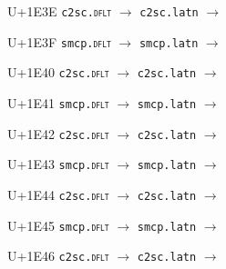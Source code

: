 \documentclass{article}
\begin{document}
\begin{substitutions}
\goodbreak

U+1E3E  \linebreak
    \texttt{c2sc.\textsc{dflt}} $\to$  \linebreak
    \texttt{c2sc.latn} $\to$  

\goodbreak

U+1E3F  \linebreak
    \texttt{smcp.\textsc{dflt}} $\to$  \linebreak
    \texttt{smcp.latn} $\to$  

\goodbreak

U+1E40  \linebreak
    \texttt{c2sc.\textsc{dflt}} $\to$  \linebreak
    \texttt{c2sc.latn} $\to$  

\goodbreak

U+1E41  \linebreak
    \texttt{smcp.\textsc{dflt}} $\to$  \linebreak
    \texttt{smcp.latn} $\to$  

\goodbreak

U+1E42  \linebreak
    \texttt{c2sc.\textsc{dflt}} $\to$  \linebreak
    \texttt{c2sc.latn} $\to$  

\goodbreak

U+1E43  \linebreak
    \texttt{smcp.\textsc{dflt}} $\to$  \linebreak
    \texttt{smcp.latn} $\to$  

\goodbreak

U+1E44  \linebreak
    \texttt{c2sc.\textsc{dflt}} $\to$  \linebreak
    \texttt{c2sc.latn} $\to$  

\goodbreak

U+1E45  \linebreak
    \texttt{smcp.\textsc{dflt}} $\to$  \linebreak
    \texttt{smcp.latn} $\to$  

\goodbreak

U+1E46  \linebreak
    \texttt{c2sc.\textsc{dflt}} $\to$  \linebreak
    \texttt{c2sc.latn} $\to$  


\end{substitutions}
\end{document}
